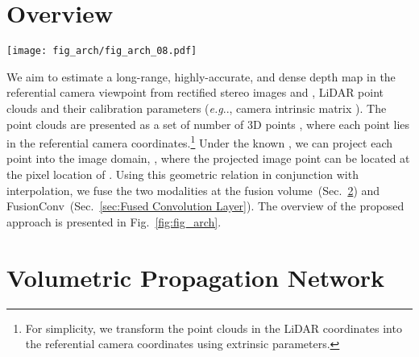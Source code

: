 \documentclass[letterpaper, 10 pt, conference]{ieeeconf}
\makeatletter
\DeclareRobustCommand\onedot{\futurelet\@let@token\@onedot}
\def\@onedot{\ifx\@let@token.\else.\null\fi\xspace}
\def\eg{\emph{e.g}\onedot} \def\Eg{{E.g}\onedot}
\newcommand{\Fref}[1]{Fig.~\textcolor{blue}{\ref{#1}}}
\newcommand{\Sref}[1]{Sec.~\textcolor{blue}{\ref{#1}}}
\makeatother
\begin{document}
\section{Overview}
\label{sec:Overview}

\begin{figure*}[!t]
\vspace{+3mm}
\centering
\texttt{[image: fig\_arch/fig\_arch\_08.pdf]}
\caption{\textbf{Overall architecture.} Our network consists of three stages: feature extraction stage, volume aggregation stage, and depth regression stage. We initially extract features from input modalities. In particular, we use FusionConv layers to infer point feature vectors . These extracted features are embedded into the fusion volume  to compute the correspondence {with stereo feature maps , }. After volume aggregation through 3D stacked hourglass networks, we finally obtain the depth map  in the referential camera view.
}
\label{fig:fig_arch}
\vspace{-4mm}
\end{figure*}

We aim to estimate a long-range, highly-accurate, and dense depth map  in the referential camera viewpoint from rectified stereo images  and , LiDAR point clouds  and their calibration parameters (\eg, camera intrinsic matrix ). The point clouds are presented as a set of  number of 3D points , where each point  lies in the referential camera coordinates.\footnote{For simplicity, we transform the point clouds in the LiDAR coordinates into the referential camera coordinates using extrinsic parameters.} Under the known , we can project each point into the image domain, , where the projected image point  can be located at the pixel location of . Using this geometric relation in conjunction with interpolation, we fuse the two modalities at the fusion volume~(\Sref{sec:Volumetric Propagation}) and FusionConv~(\Sref{sec:Fused Convolution Layer}). The overview of the proposed approach is presented in \Fref{fig:fig_arch}. 


\section{Volumetric Propagation Network}
\label{sec:Volumetric Propagation}
\end{document}
